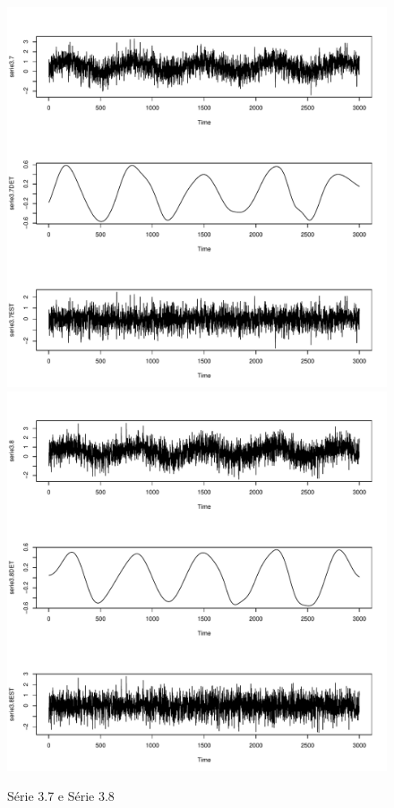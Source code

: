 \graphicspath{{imagens/}}
\begin{figure}[H]
\begin{center}
  \includegraphics[scale=0.43]{serie3_7.pdf} \quad
  \includegraphics[scale=0.43]{serie3_8.pdf}
  \caption{Série 3.7 e Série 3.8}

\end{center}
\end{figure}

